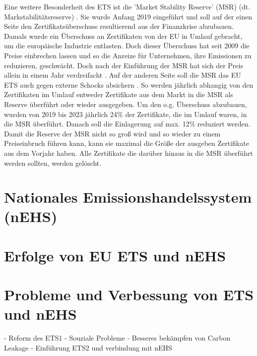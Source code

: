 Eine weitere Besonderheit des ETS ist die 'Market Stability Reserve' (MSR) (dt. Markstabilitätsreserve) \cite{eu3.2023}. Sie wurde Anfang 2019 eingeführt und soll auf der einen Seite den Zertifikatsüberschuss resultierend aus der Finanzkrise abzubauen. 
Damals wurde ein Überschuss an Zertifikaten von der EU in Umlauf gebracht, um die europäische Industrie entlasten. 
Doch dieser Überschuss hat seit 2009 die Preise einbrechen lassen und so die Anreize für Unternehmen, ihre Emissionen zu reduzieren, geschwächt. Doch nach der Einführung der MSR hat sich der Preis allein in einem Jahr verdreifacht .
Auf der anderen Seite soll die MSR das EU ETS auch gegen externe Schocks absichern \cite{eu3.2023}. 
So werden jährlich abhangig von den Zertifikaten im Umlauf entweder Zertifikate aus dem Markt in die MSR als Reserve überführt oder wieder ausgegeben. 
Um den o.g. Überschuss abzubauen, wurden von 2019 bis 2023 jährlich 24\% der Zertifikate, die im Umlauf waren, in die MSR überführt. 
Danach soll die Einlagerung auf max. 12\% reduziert werden.
Damit die Reserve der MSR nicht so groß wird und so wieder zu einem Preiseinbruch führen kann, kann sie maximal die Größe der ausgeben Zertifikate aus dem Vorjahr haben. 
Alle Zertifikate die darüber hinaus in die MSR überführt werden sollten, werden gelöscht. 

\section{Nationales Emissionshandelssystem (nEHS)}

\section{Erfolge von EU ETS und nEHS}

\section{Probleme und Verbessung von ETS und nEHS}
- Reform des ETS1
- Souziale Probleme
- Besseres bekämpfen von Carbon Leakage
- Einführung ETS2 und verbindung mit nEHS




